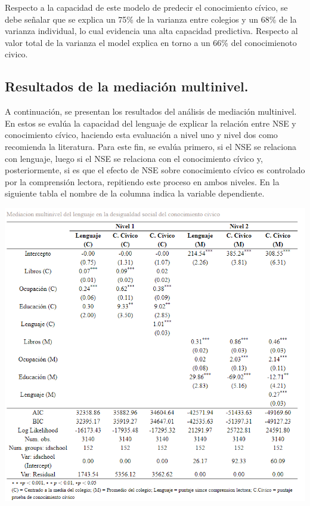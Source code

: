 \documentclass[12pt,twoside]{templates/facsothesis}
\begin{document}
Respecto a la capacidad de este modelo de predecir el conocimiento cívico, se debe señalar que se explica un 75\% de la varianza entre colegios y un 68\% de la varianza individual, lo cual evidencia una alta capacidad predictiva. Respecto al valor total de la varianza el model explica en torno a un 66\% del conocimienoto civico.

\hypertarget{resultados-de-la-mediaciuxf3n-multinivel.}{%
\subsection{Resultados de la mediación multinivel.}\label{resultados-de-la-mediaciuxf3n-multinivel.}}

A continuación, se presentan los resultados del análisis de mediación multinivel. En estos se evalúa la capacidad del lenguaje de explicar la relación entre NSE y conocimiento cívico, haciendo esta evaluación a nivel uno y nivel dos como recomienda la literatura. Para este fin, se evalúa primero, si el NSE se relaciona con lenguaje, luego si el NSE se relaciona con el conocimiento cívico y, posteriormente, si es que el efecto de NSE sobre conocimiento cívico es controlado por la comprensión lectora, repitiendo este proceso en ambos niveles. En la siguiente tabla el nombre de la columna indica la variable dependiente.

\begin{center}\includegraphics[width=0.8\linewidth,]{images/Mediacion_n1n2} \end{center}
\end{document}
